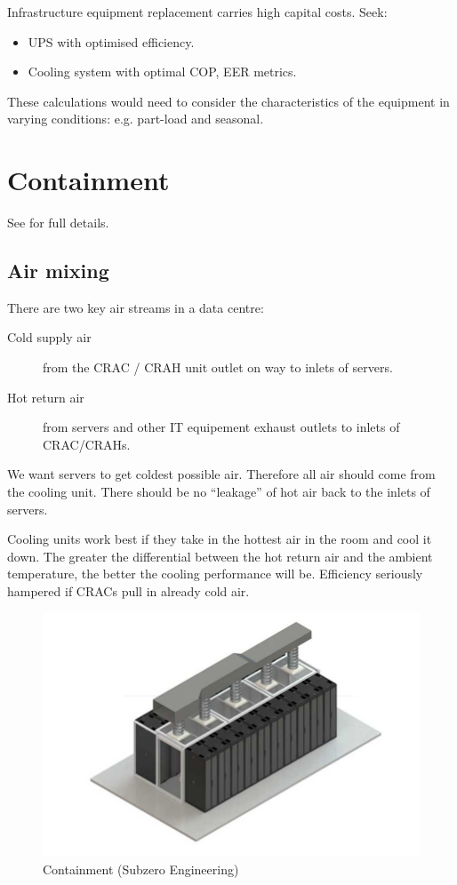 \documentclass{pgnotes}
\begin{document}
Infrastructure equipment replacement carries high capital costs.
Seek:
\begin{itemize}
\item UPS with optimised efficiency.
\item Cooling system with optimal COP, EER metrics. 
\end{itemize}
These calculations would need to consider the characteristics of the equipment in varying conditions: e.g. part-load and seasonal.

\section{Containment}
\label{sec:containment}

See \citep{rasmussen:2017:the-different} for full details.

\subsection{Air mixing}

There are two key air streams in a data centre:
\begin{description}
\item[Cold supply air] from the CRAC / CRAH unit outlet on way to inlets of servers.
\item[Hot return air] from servers and other IT equipement exhaust outlets to inlets of CRAC/CRAHs.
\end{description}

We want servers to get coldest possible air.
Therefore all air should come from the cooling unit.
There should be no ``leakage'' of hot air back to the inlets of servers. 

Cooling units work best if they take in the hottest air in the room and cool it down.
The greater the differential between the hot return air and the ambient temperature, the better the cooling performance will be. 
Efficiency seriously hampered if CRACs pull in already cold air.

\begin{figure}[htbp]
  \centering
  \includegraphics[width=0.75\linewidth]{containment_photo_subzero}
  \caption{Containment (Subzero Engineering)}
  \label{fig:containment-system}
\end{figure}
\end{document}
